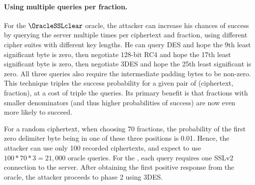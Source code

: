 \paragraph{Using multiple queries per fraction.}
For the $\OracleSSLclear$ oracle, the attacker can increase his chances of success by querying the server multiple times per
ciphertext and fraction, using different cipher suites with different key lengths. He can query DES and hope
the 9th least significant byte is zero, then negotiate 128-bit RC4
and hope the 17th least significant byte is zero, then negotiate
3DES and hope the 25th least significant is zero. All three queries also require
the intermediate padding bytes to be non-zero. This technique
triples the success probability for a given pair of (ciphertext, fraction),
at a cost of triple the queries. Its primary benefit is that fractions with smaller
denominators (and thus higher probabilities of success) are now even more likely
to succeed.

For a random ciphertext, when choosing 70 fractions, the probability of the
first zero delimiter byte being in one of these three positions is 0.01.
Hence, the attacker can use only 100 recorded ciphertexts, and expect to use
$100 * 70 * 3 = 21,000$ oracle queries. For the \tOracleSSLclear, each
query requires one SSLv2 connection to the server.
After obtaining the first positive response from the oracle, the attacker
proceeds to phase 2 using 3DES.

